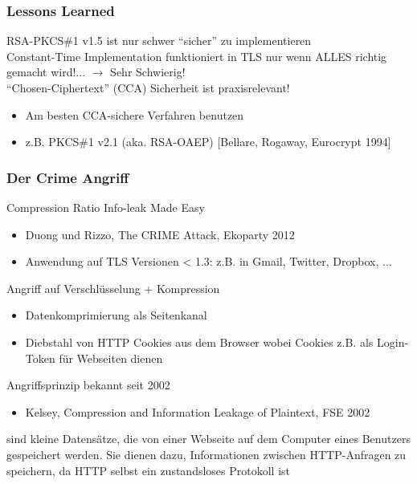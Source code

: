 \subsubsection*{Lessons Learned}
RSA-PKCS\#1 v1.5 ist nur  schwer \enquote{sicher} zu implementieren\\
Constant-Time Implementation funktioniert in TLS nur wenn ALLES richtig gemacht wird!... $\rightarrow$ Sehr Schwierig!\\
\enquote{Chosen-Ciphertext} (CCA) Sicherheit ist praxisrelevant!
\begin{itemize}
    \item Am besten CCA-sichere Verfahren benutzen
    \item z.B. PKCS\#1 v2.1 (aka. RSA-OAEP) [Bellare, Rogaway, Eurocrypt 1994]
\end{itemize}
\subsubsection*{Der Crime Angriff}
Compression Ratio Info-leak Made Easy
\begin{itemize}
    \item Duong und Rizzo, The CRIME Attack, Ekoparty 2012
    \item Anwendung auf TLS Versionen < 1.3: z.B. in Gmail, Twitter, Dropbox, ...
\end{itemize}
Angriff auf Verschlüsselung + Kompression
\begin{itemize}
    \item {} Datenkomprimierung als Seitenkanal
    \item {} Diebstahl von HTTP Cookies aus dem Browser wobei Cookies z.B. als Login-Token für Webseiten dienen
\end{itemize}
Angriffsprinzip bekannt seit 2002
\begin{itemize}
    \item Kelsey, Compression and Information Leakage of Plaintext, FSE 2002
\end{itemize}
\begin{infoBox}[title=HTTP Cookies: Grundlagen]
     sind kleine Datensätze, die von einer Webseite auf dem Computer eines Benutzers gespeichert werden. Sie dienen dazu, Informationen zwischen HTTP-Anfragen zu speichern, da HTTP selbst ein zustandsloses Protokoll ist
\end{infoBox}
